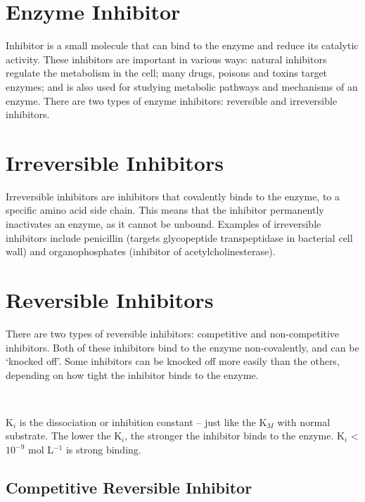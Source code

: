 \section{Enzyme Inhibitor}

Inhibitor is a small molecule that can bind to the enzyme and reduce its catalytic activity.
These inhibitors are important in various ways: natural inhibitors regulate the metabolism in the cell; many drugs, poisons and toxins target enzymes; and is also used for studying metabolic pathways and mechanisms of an enzyme.
There are two types of enzyme inhibitors: reversible and irreversible inhibitors.

\section{Irreversible Inhibitors}

Irreversible inhibitors are inhibitors that covalently binds to the enzyme, to a specific amino acid side chain.
This means that the inhibitor permanently inactivates an enzyme, as it cannot be unbound.
Examples of irreversible inhibitors include penicillin (targets glycopeptide transpeptidase in bacterial cell wall) and organophosphates (inhibitor of acetylcholinesterase).

\section{Reversible Inhibitors}

There are two types of reversible inhibitors: competitive and non-competitive inhibitors.
Both of these inhibitors bind to the enzyme non-covalently, and can be `knocked off'.
Some inhibitors can be knocked off more easily than the others, depending on how tight the inhibitor binds to the enzyme.

\begin{center}
\\

\vspace{0.5cm}

\end{center}

K$_i$ is the dissociation or inhibition constant -- just like the K$_M$ with normal substrate.
The lower the K$_i$, the stronger the inhibitor binds to the enzyme.
K$_i$ \textless{} $10^{-9}$ mol L$^{-1}$ is strong binding.

\subsection{Competitive Reversible Inhibitor}

